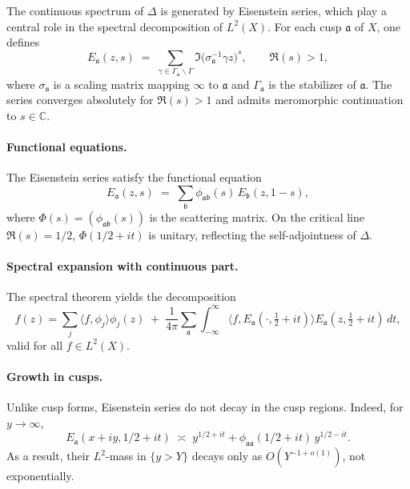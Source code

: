 The continuous spectrum of $\Delta$ is generated by Eisenstein series, 
which play a central role in the spectral decomposition of $L^2(X)$.  
For each cusp $\mathfrak{a}$ of $X$, one defines
\begin{equation}\label{eq:eisenstein}
  E_\mathfrak{a}(z,s) \;=\; \sum_{\gamma \in \Gamma_\mathfrak{a}\backslash \Gamma} 
  \Im\!\big(\sigma_\mathfrak{a}^{-1}\gamma z\big)^s,
  \qquad \Re(s)>1,
\end{equation}
where $\sigma_\mathfrak{a}$ is a scaling matrix mapping $\infty$ to $\mathfrak{a}$ 
and $\Gamma_\mathfrak{a}$ is the stabilizer of $\mathfrak{a}$.  
The series converges absolutely for $\Re(s)>1$ and admits meromorphic continuation 
to $s\in \mathbb{C}$.

\paragraph{Functional equations.}
The Eisenstein series satisfy the functional equation
\[
  E_\mathfrak{a}(z,s) \;=\; \sum_{\mathfrak{b}} 
    \phi_{\mathfrak{a}\mathfrak{b}}(s)\, E_\mathfrak{b}(z,1-s),
\]
where $\Phi(s)=(\phi_{\mathfrak{a}\mathfrak{b}}(s))$ is the scattering matrix.  
On the critical line $\Re(s)=1/2$, $\Phi(1/2+it)$ is unitary, reflecting the 
self-adjointness of $\Delta$.

\paragraph{Spectral expansion with continuous part.}
The spectral theorem yields the decomposition
\begin{equation}\label{eq:spectral-expansion}
  f(z) = \sum_j \langle f, \phi_j \rangle \phi_j(z) 
  \;+\; \frac{1}{4\pi}\sum_{\mathfrak{a}} \int_{-\infty}^{\infty} 
      \langle f, E_\mathfrak{a}(\cdot,\tfrac12+it)\rangle 
      E_\mathfrak{a}(z,\tfrac12+it)\, dt,
\end{equation}
valid for all $f\in L^2(X)$.

\paragraph{Growth in cusps.}
Unlike cusp forms, Eisenstein series do not decay in the cusp regions.  
Indeed, for $y\to\infty$,
\[
  E_\mathfrak{a}(x+iy, 1/2+it) \;\asymp\; y^{1/2+it} + \phi_{\mathfrak{a}\mathfrak{a}}(1/2+it)\, y^{1/2-it}.
\]
As a result, their $L^2$-mass in $\{y>Y\}$ decays only as $O(Y^{-1+o(1)})$, 
not exponentially.  

